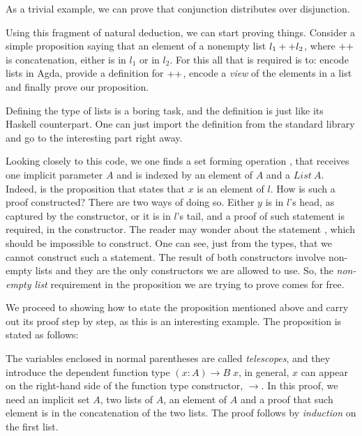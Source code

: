 As a trivial example, we can prove that conjunction distributes
over disjunction.


Using this fragment of natural deduction, we can start proving things. Consider a simple
proposition saying that an element of a nonempty list $l_1 ++ l_2$, where $++$ is concatenation, either is
in $l_1$ or in $l_2$. For this all that is required is to: encode lists in Agda, provide a definition for $++$,
encode a \emph{view} of the elements in a list and finally prove our proposition.

Defining the type of lists is a boring task, and the definition is just like
its Haskell counterpart. One can just import the definition from the standard library and go to the
interesting part right away.


Looking closely to this code, we one finds a set forming operation , that receives
one implicit parameter $A$ and is indexed by an element of $A$ and a $List\ A$. Indeed, 
is the proposition that states that $x$ is an element of $l$. How is such a proof constructed?
There are two ways of doing so. Either $y$ is in $l$'s head, as captured by the 
constructor, or it is in $l$'s tail, and a proof of such statement is required, in the 
constructor. The reader may wonder about the statement , which should be impossible to construct. One can see,
just from the types, that we cannot construct such a statement. The result of both  constructors
involve non-empty lists and they are the only constructors we are allowed to use. So, the \emph{non-empty list}
requirement in the proposition we are trying to prove comes for free.

We proceed to showing how to state the proposition mentioned above and carry out its proof step by step, as this is an interesting example.
The proposition is stated as follows:


The variables enclosed in normal parentheses are called \emph{telescopes}, and they introduce
the dependent function type $(x : A) \rightarrow B\;x$, in general, $x$ can appear on the right-hand side of
the function type constructor, $\rightarrow$. In this proof, we need an implicit set $A$, two lists of $A$,
an element of $A$ and a proof that such element is in the concatenation of the two lists.
The proof follows by \emph{induction} on the first list. 

